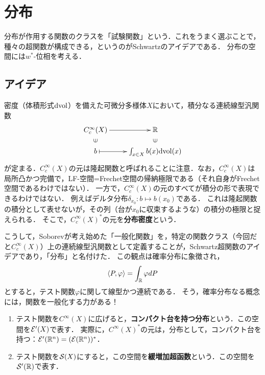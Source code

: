 \documentclass[uplatex,dvipdfmx]{jsreport}
\begin{document}
\section{分布}

\begin{tcolorbox}[colframe=ForestGreen, colback=ForestGreen!10!white,breakable,colbacktitle=ForestGreen!40!white,coltitle=black,fonttitle=\bfseries\sffamily,
title=]
    分布が作用する関数のクラスを「試験関数」という．これをうまく選ぶことで，種々の超関数が構成できる，というのがSchwartzのアイデアである．
    分布の空間には$w^*$-位相を考える．
\end{tcolorbox}

\subsection{アイデア}

\begin{discussion}
    密度（体積形式$\mathrm{dvol}$）を備えた可微分多様体$X$において，積分なる連続線型汎関数
    \[\xymatrix@R-2pc{
        C^\infty_c(X)\ar[r]&\R\\
        \rotatebox[origin=c]{90}{$\in$}&\rotatebox[origin=c]{90}{$\in$}\\
        b\ar@{|->}[r]&\int_{x\in X}b(x)\dvol(x)
    }\]
    が定まる．$C_c^\infty(X)$の元は隆起関数と呼ばれることに注意．なお，$C_c^\infty(X)$は局所凸かつ完備で，LF-空間=Frechet空間の帰納極限である（それ自身がFrechet空間であるわけではない）．
    一方で，$C_c^\infty(X)$の元のすべてが積分の形で表現できるわけではない．
    例えばデルタ分布$\delta_{x_0}:b\mapsto b(x_0)$である．
    これは隆起関数の積分として表せないが，その列（台が$x_0$に収束するような）の積分の極限と捉えられる．
    そこで，$C_c^\infty(X)^*$の元を\textbf{分布密度}という．
\end{discussion}
\begin{remarks}
    こうして，Soborevが考え始めた「一般化関数」を，特定の関数クラス（今回だと$C_c^\infty(X)$）上の連続線型汎関数として定義することが，Schwartz超関数のアイデアであり，「分布」と名付けた．
    この観点は確率分布に象徴され，
    \[\langle P,\varphi\rangle=\int_{\mathbb{R}}\varphi dP\]
    とすると，テスト関数$\varphi$に関して線型かつ連続である．
    そう，確率分布なる概念には，関数を一般化する力がある！
\end{remarks}

\begin{definition}\mbox{}
    \begin{enumerate}
        \item テスト関数を$C^\infty(X)$に広げると，\textbf{コンパクト台を持つ分布}という．この空間を$\mathcal{E}'(X)$で表す．
        実際に，$C^\infty(X)^*$の元は，分布として，コンパクト台を持つ：$\mathcal{E}'(\mathbb{R}^n)=(\mathcal{E}(\mathbb{R}^n))^*$．
        \item テスト関数を$\mathcal{S}(X)$にすると，この空間を\textbf{緩増加超函数}という．この空間を$\mathcal{S}'(\mathbb{R})$で表す．
    \end{enumerate}
\end{definition}
\end{document}
